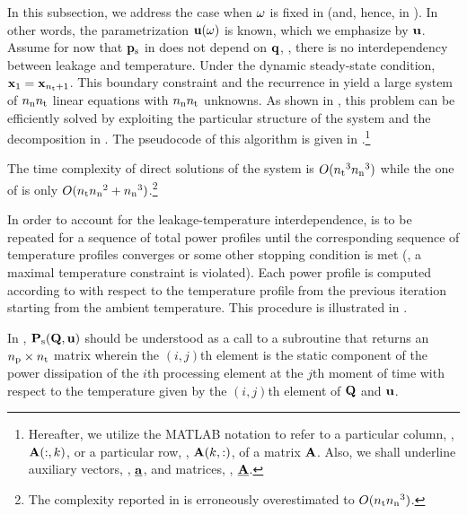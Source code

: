 In this subsection, we address the case when $\omega$ is fixed in  (and, hence, in ).
In other words, the parametrization $\mathbf{u}(\omega)$ is known, which we emphasize by $\mathbf{u}$.
Assume for now that $\mathbf{p}_{\text{s}}$ in  does not depend on $\mathbf{q}$, \ie, there is no interdependency between leakage and temperature.
Under the dynamic steady-state condition, $\mathbf{x}_1 = \mathbf{x}_{{n_\text{t}} + 1}$.
This boundary constraint and the recurrence in  yield a large system of ${n_\text{n}} {n_\text{t}}$ linear equations with ${n_\text{n}} {n_\text{t}}$ unknowns.
As shown in \cite{ukhov2012}, this problem can be efficiently solved by exploiting the particular structure of the system and the decomposition in .
The pseudocode of this algorithm is given in .\footnote{Hereafter, we utilize the MATLAB notation to refer to a particular column, \eg, $\mathbf{A}(:, k)$, or a particular row, \eg, $\mathbf{A}(k, :)$, of a matrix $\mathbf{A}$. Also, we shall underline auxiliary vectors, \eg, $\underline{\mathbf{a}}$, and matrices, \eg, $\underline{\mathbf{A}}$.}


The time complexity of direct solutions of the system is $O({n_\text{t}}^3 {n_\text{n}}^3)$ while the one of  is only $O({n_\text{t}} {n_\text{n}}^2 + {n_\text{n}}^3)$.\footnote{The complexity reported in \cite{ukhov2012} is erroneously overestimated to $O({n_\text{t}} {n_\text{n}}^3)$.}

In order to account for the leakage-temperature interdependence,  is to be repeated for a sequence of total power profiles until the corresponding sequence of temperature profiles converges or some other stopping condition is met (\eg, a maximal temperature constraint is violated).
Each power profile is computed according to  with respect to the temperature profile from the previous iteration starting from the ambient temperature.
This procedure is illustrated in .


In , $\mathbf{P}_{\text{s}}(\mathbf{Q}, \mathbf{u})$ should be understood as a call to a subroutine that returns an ${n_\text{p}} \times {n_\text{t}}$ matrix wherein the $(i, j)$th element is the static component of the power dissipation of the $i$th processing element at the $j$th moment of time with respect to the temperature given by the $(i, j)$th element of $\mathbf{Q}$ and $\mathbf{u}$.
